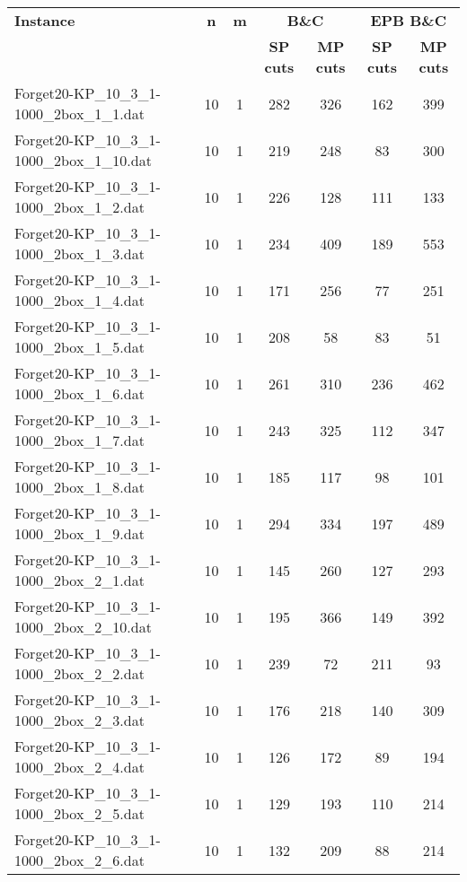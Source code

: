 \begin{table}[!ht]
\centering
\hspace*{-1cm}\begin{tabular}{lcccccc}
\toprule
\textbf{Instance} & \textbf{n} & \textbf{m} & \multicolumn{2}{c}{\textbf{B\&C}}  & \multicolumn{2}{c}{\textbf{EPB B\&C}}
\\
\cmidrule(r){4-5} \cmidrule(r){6-7} 
~ & ~ & ~ & \textbf{SP cuts} &\textbf{MP cuts} & \textbf{SP cuts} &\textbf{MP cuts} \\
\midrule

Forget20-KP\_10\_3\_1-1000\_2box\_1\_1.dat & 10 & 1 & 282 & 326 & 162 & 399 \\
Forget20-KP\_10\_3\_1-1000\_2box\_1\_10.dat & 10 & 1 & 219 & 248 & 83 & 300 \\
Forget20-KP\_10\_3\_1-1000\_2box\_1\_2.dat & 10 & 1 & 226 & 128 & 111 & 133 \\
Forget20-KP\_10\_3\_1-1000\_2box\_1\_3.dat & 10 & 1 & 234 & 409 & 189 & 553 \\
Forget20-KP\_10\_3\_1-1000\_2box\_1\_4.dat & 10 & 1 & 171 & 256 & 77 & 251 \\
Forget20-KP\_10\_3\_1-1000\_2box\_1\_5.dat & 10 & 1 & 208 & 58 & 83 & 51 \\
Forget20-KP\_10\_3\_1-1000\_2box\_1\_6.dat & 10 & 1 & 261 & 310 & 236 & 462 \\
Forget20-KP\_10\_3\_1-1000\_2box\_1\_7.dat & 10 & 1 & 243 & 325 & 112 & 347 \\
Forget20-KP\_10\_3\_1-1000\_2box\_1\_8.dat & 10 & 1 & 185 & 117 & 98 & 101 \\
Forget20-KP\_10\_3\_1-1000\_2box\_1\_9.dat & 10 & 1 & 294 & 334 & 197 & 489 \\
Forget20-KP\_10\_3\_1-1000\_2box\_2\_1.dat & 10 & 1 & 145 & 260 & 127 & 293 \\
Forget20-KP\_10\_3\_1-1000\_2box\_2\_10.dat & 10 & 1 & 195 & 366 & 149 & 392 \\
Forget20-KP\_10\_3\_1-1000\_2box\_2\_2.dat & 10 & 1 & 239 & 72 & 211 & 93 \\
Forget20-KP\_10\_3\_1-1000\_2box\_2\_3.dat & 10 & 1 & 176 & 218 & 140 & 309 \\
Forget20-KP\_10\_3\_1-1000\_2box\_2\_4.dat & 10 & 1 & 126 & 172 & 89 & 194 \\
Forget20-KP\_10\_3\_1-1000\_2box\_2\_5.dat & 10 & 1 & 129 & 193 & 110 & 214 \\
Forget20-KP\_10\_3\_1-1000\_2box\_2\_6.dat & 10 & 1 & 132 & 209 & 88 & 214 \\

\end{tabular}
\end{table}
